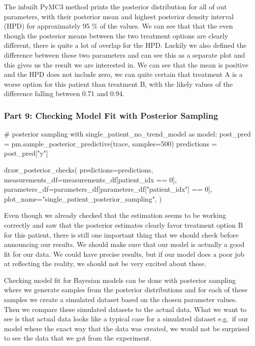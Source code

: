 \documentclass[12pt,a4paper,leqno]{report}
\theoremstyle{plain}
\theoremstyle{definition}
\theoremstyle{remark}
\begin{document}
The inbuilt PyMC3 method prints the posterior distribution for all of out parameters,
with their posterior mean and highest posterior density interval (HPD) for approximately
95 \% of the values. We can see that that the even though the posterior means between
the two treatment options are clearly different, there is quite a lot of overlap for the
HPD. Luckily we also defined the difference between these two parameters and can see
this as a separate plot and this gives us the result we are interested in. We can see
that the mean is positive and the HPD does not include zero, we can quite certain that
treatment A is a worse option for this patient than treatment B, with the likely values of
the difference falling between 0.71 and 0.94.

\subsubsection*{Part 9: Checking Model Fit with Posterior Sampling}

\bigskip
\begin{pyverbatim}[][fontsize=\footnotesize]
# posterior sampling
with single_patient_no_trend_model as model:
    post_pred = pm.sample_posterior_predictive(trace, samples=500)
    predictions = post_pred["y"]

draw_posterior_checks(
    predictions=predictions,
    measurements_df=measurements_df[patient_idx == 0],
    parameters_df=parameters_df[parameters_df["patient_idx"] == 0],
    plot_name="single_patient_posterior_sampling",
)
\end{pyverbatim}
\bigskip

Even though we already checked that the estimation seems to be working correctly and saw
that the posterior estimates clearly favor treatment option B for this patient, there is
still one important thing that we should check before announcing our results. We should
make sure that our model is actually a good fit for our data. We could have precise
results, but if our model does a poor job at reflecting the
reality, we should not be very excited about these.

Checking model fit for Bayesian models can be done with posterior sampling where we generate samples from
the posterior distributions and for each of these samples we create a simulated dataset based
on the chosen parameter values. Then we compare these simulated datasets to the actual
data. What we want to see is that actual data looks like a typical case for a simulated
dataset e.g.\ if our model where the exact way that the data was created, we would not be
surprised to see the data that we got from the experiment.
\end{document}
